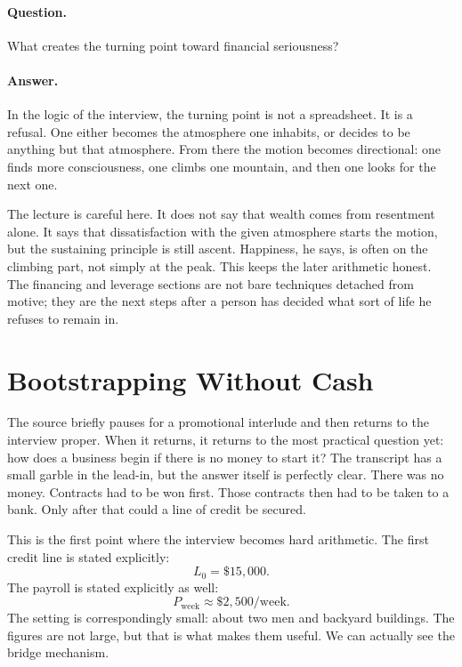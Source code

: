 \paragraph{Question.} What creates the turning point toward financial seriousness?

\paragraph{Answer.} In the logic of the interview, the turning point is not a spreadsheet. It is a refusal. One either becomes the atmosphere one inhabits, or decides to be anything but that atmosphere. From there the motion becomes directional: one finds more consciousness, one climbs one mountain, and then one looks for the next one.

The lecture is careful here. It does not say that wealth comes from resentment alone. It says that dissatisfaction with the given atmosphere starts the motion, but the sustaining principle is still ascent. Happiness, he says, is often on the climbing part, not simply at the peak. This keeps the later arithmetic honest. The financing and leverage sections are not bare techniques detached from motive; they are the next steps after a person has decided what sort of life he refuses to remain in.

\section{Bootstrapping Without Cash}

The source briefly pauses for a promotional interlude and then returns to the interview proper. When it returns, it returns to the most practical question yet: how does a business begin if there is no money to start it? The transcript has a small garble in the lead-in, but the answer itself is perfectly clear. There was no money. Contracts had to be won first. Those contracts then had to be taken to a bank. Only after that could a line of credit be secured.

This is the first point where the interview becomes hard arithmetic. The first credit line is stated explicitly:
\begin{equation}
L_0 = \$15{,}000.
\end{equation}
The payroll is stated explicitly as well:
\begin{equation}
P_{\text{week}} \approx \$2{,}500/\text{week}.
\end{equation}
The setting is correspondingly small: about two men and backyard buildings. The figures are not large, but that is what makes them useful. We can actually see the bridge mechanism.

